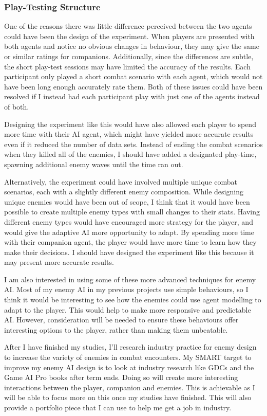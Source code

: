 \documentclass{IEEEtran}
\begin{document}
\subsubsection{Play-Testing Structure}

One of the reasons there was little difference perceived between the two agents could have been the design of the experiment. When players are presented with both agents and notice no obvious changes in behaviour, they may give the same or similar ratings for companions. Additionally, since the differences are subtle, the short play-test sessions may have limited the accuracy of the results. Each participant only played a short combat scenario with each agent, which would not have been long enough accurately rate them. Both of these issues could have been resolved if I instead had each participant play with just one of the agents instead of both.

Designing the experiment like this would have also allowed each player to spend more time with their AI agent, which might have yielded more accurate results even if it reduced the number of data sets. Instead of ending the combat scenarios when they killed all of the enemies, I should have added a designated play-time, spawning additional enemy waves until the time ran out.

Alternatively, the experiment could have involved multiple unique combat scenarios, each with a slightly different enemy composition. While designing unique enemies would have been out of scope, I think that it would have been possible to create multiple enemy types with small changes to their stats. Having different enemy types would have encouraged more strategy for the player, and would give the adaptive AI more opportunity to adapt. By spending more time with their companion agent, the player would have more time to learn how they make their decisions. I should have designed the experiment like this because it may present more accurate results.

I am also interested in using some of these more advanced techniques for enemy AI. Most of my enemy AI in my previous projects use simple behaviours, so I think it would be interesting to see how the enemies could use agent modelling to adapt to the player. This would help to make more responsive and predictable AI. However, consideration will be needed to ensure these behaviours offer interesting options to the player, rather than making them unbeatable.

After I have finished my studies, I’ll research industry practice for enemy design to increase the variety of enemies in combat encounters. My SMART target to improve my enemy AI design is to look at industry research like GDCs and the Game AI Pro books after term ends. Doing so will create more interesting interactions between the player, companion and enemies. This is achievable as I will be able to focus more on this once my studies have finished. This will also provide a portfolio piece that I can use to help me get a job in industry.
\end{document}
